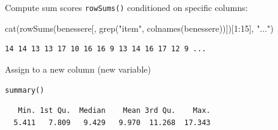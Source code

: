 \documentclass[
  ignorenonframetext,
]{beamer}
\newenvironment{Shaded}{\begin{snugshade}}{\end{snugshade}}
\newcommand{\DecValTok}[1]{\textcolor[rgb]{0.69,0.50,0.00}{#1}}
\newcommand{\FunctionTok}[1]{\textcolor[rgb]{0.39,0.29,0.61}{#1}}
\newcommand{\NormalTok}[1]{\textcolor[rgb]{0.12,0.11,0.11}{#1}}
\newcommand{\OtherTok}[1]{\textcolor[rgb]{0.00,0.43,0.16}{#1}}
\newcommand{\SpecialCharTok}[1]{\textcolor[rgb]{0.24,0.68,0.91}{#1}}
\newcommand{\StringTok}[1]{\textcolor[rgb]{0.75,0.01,0.01}{#1}}
\begin{document}
\begin{frame}[fragile]{Compute sum scores}
\protect\hypertarget{compute-sum-scores-1}{}
\texttt{rowSums()} conditioned on specific columns:

\small

\begin{Shaded}
\begin{Highlighting}[]
\FunctionTok{cat}\NormalTok{(}\FunctionTok{rowSums}\NormalTok{(benessere[, }\FunctionTok{grep}\NormalTok{(}\StringTok{"item"}\NormalTok{, }\FunctionTok{colnames}\NormalTok{(benessere))])[}\DecValTok{1}\SpecialCharTok{:}\DecValTok{15}\NormalTok{], }\StringTok{"..."}\NormalTok{)}
\end{Highlighting}
\end{Shaded}

\begin{verbatim}
14 14 13 13 17 10 16 16 9 13 14 16 17 12 9 ...
\end{verbatim}

Assign to a new column (new variable)

\begin{Shaded}
\end{Shaded}
\end{frame}

\begin{frame}[fragile]{\texttt{summary()}}
\protect\hypertarget{summary}{}
\small

\begin{Shaded}
\end{Shaded}

\begin{verbatim}
   Min. 1st Qu.  Median    Mean 3rd Qu.    Max. 
  5.411   7.809   9.429   9.970  11.268  17.343 
\end{verbatim}
\end{frame}
\end{document}
